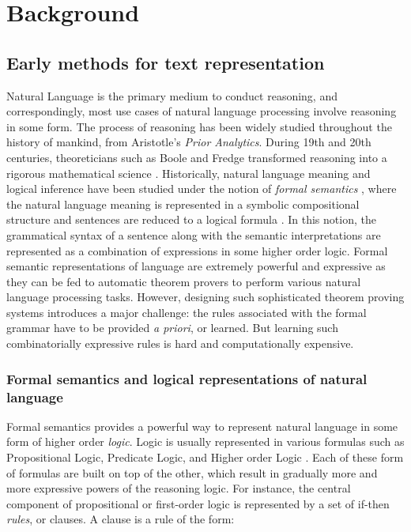 \documentclass[letterpaper, 12pt]{report}
\begin{document}
\clearpage

\chapter{Background}
\label{sec:orgaa03e11}


\section{Early methods for text representation}
\label{sec:bg_early_methods}

Natural Language is the primary medium to conduct reasoning, and correspondingly, most use cases of natural language processing involve reasoning in some form. The process of reasoning has been widely studied throughout the history of mankind, from Aristotle's \textit{Prior Analytics}. During 19th and 20th centuries, theoreticians such as Boole and Fredge transformed reasoning into a rigorous mathematical science \cite{van2008brief}. Historically, natural language meaning and logical inference have been studied under the notion of \textit{formal semantics} \cite{van1995language}, where the natural language meaning is represented in a symbolic compositional structure and sentences are reduced to a logical formula \cite{MacCartney2009-sz}. In this notion, the grammatical syntax of a sentence along with the semantic interpretations are represented as a combination of expressions in some higher order logic. Formal semantic representations of language are extremely powerful and expressive as they can be fed to automatic theorem provers to perform various natural language processing tasks. However, designing such sophisticated theorem proving systems introduces a major challenge: the rules associated with the formal grammar have to be provided \textit{a priori}, or learned. But learning such combinatorially expressive rules is hard and computationally expensive.

\subsection{Formal semantics and logical representations of natural language}
\label{sec:bg_formal_semantics}

Formal semantics provides a powerful way to represent natural language in some form of higher order \textit{logic}. Logic is usually represented in various formulas such as Propositional Logic, Predicate Logic, and Higher order Logic \cite{kowalski1979logic}. Each of these form of formulas are built on top of the other, which result in gradually more and more expressive powers of the reasoning logic.
For instance, the central component of propositional or first-order logic is represented by a set of if-then \textit{rules}, or clauses. A clause is a rule of the form:
\end{document}
